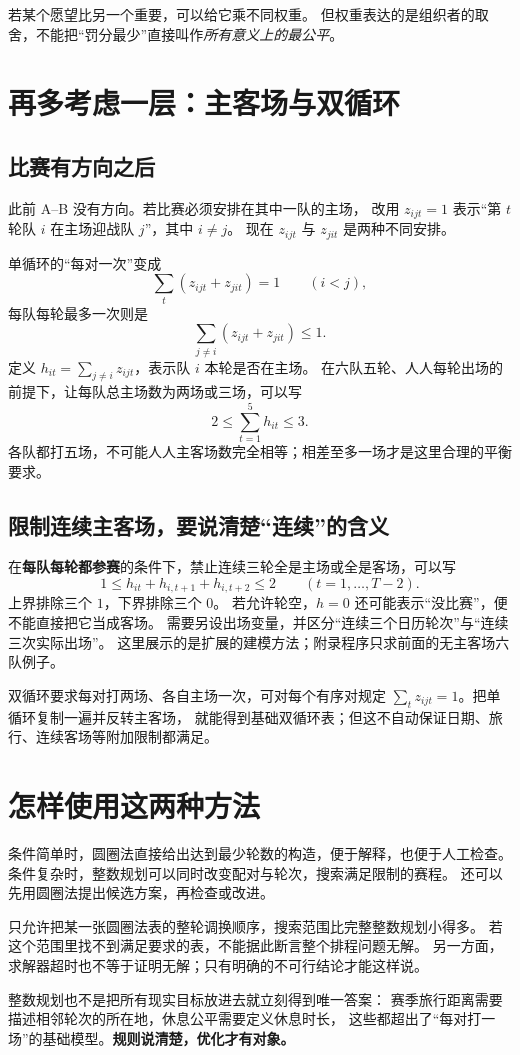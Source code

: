 \documentclass[UTF8,11pt,fontset=none]{ctexart}
\begin{document}
若某个愿望比另一个重要，可以给它乘不同权重。
但权重表达的是组织者的取舍，不能把“罚分最少”直接叫作\emph{所有意义上的最公平}。

\section{再多考虑一层：主客场与双循环}
\subsection{比赛有方向之后}
此前 A--B 没有方向。若比赛必须安排在其中一队的主场，
改用 $z_{ijt}=1$ 表示“第 $t$ 轮队 $i$ 在主场迎战队 $j$”，其中 $i\ne j$。
现在 $z_{ijt}$ 与 $z_{jit}$ 是两种不同安排。

单循环的“每对一次”变成
\[
\sum_t(z_{ijt}+z_{jit})=1\qquad(i<j),
\]
每队每轮最多一次则是
\[
\sum_{j\ne i}(z_{ijt}+z_{jit})\le1.
\]
定义 $h_{it}=\sum_{j\ne i}z_{ijt}$，表示队 $i$ 本轮是否在主场。
在六队五轮、人人每轮出场的前提下，让每队总主场数为两场或三场，可以写
\[
2\le\sum_{t=1}^5h_{it}\le3.
\]
各队都打五场，不可能人人主客场数完全相等；相差至多一场才是这里合理的平衡要求。

\subsection{限制连续主客场，要说清楚“连续”的含义}
在\textbf{每队每轮都参赛}的条件下，禁止连续三轮全是主场或全是客场，可以写
\[
1\le h_{it}+h_{i,t+1}+h_{i,t+2}\le2
\qquad(t=1,\dots,T-2).
\]
上界排除三个 $1$，下界排除三个 $0$。
若允许轮空，$h=0$ 还可能表示“没比赛”，便不能直接把它当成客场。
需要另设出场变量，并区分“连续三个日历轮次”与“连续三次实际出场”。
这里展示的是扩展的建模方法；附录程序只求前面的无主客场六队例子。

双循环要求每对打两场、各自主场一次，可对每个有序对规定
$\sum_t z_{ijt}=1$。把单循环复制一遍并反转主客场，
就能得到基础双循环表；但这不自动保证日期、旅行、连续客场等附加限制都满足。

\section{怎样使用这两种方法}
条件简单时，圆圈法直接给出达到最少轮数的构造，便于解释，也便于人工检查。
条件复杂时，整数规划可以同时改变配对与轮次，搜索满足限制的赛程。
还可以先用圆圈法提出候选方案，再检查或改进。

\begin{warnbox}
只允许把某一张圆圈法表的整轮调换顺序，搜索范围比完整整数规划小得多。
若这个范围里找不到满足要求的表，不能据此断言整个排程问题无解。
另一方面，求解器超时也不等于证明无解；只有明确的不可行结论才能这样说。
\end{warnbox}
整数规划也不是把所有现实目标放进去就立刻得到唯一答案：
赛季旅行距离需要描述相邻轮次的所在地，休息公平需要定义休息时长，
这些都超出了“每对打一场”的基础模型。\textbf{规则说清楚，优化才有对象。}
\end{document}
